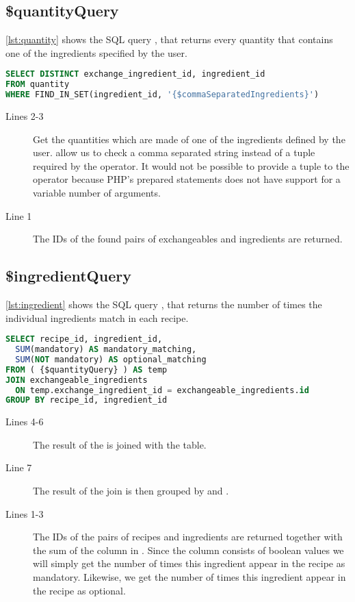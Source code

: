 \subsection*{\$quantityQuery}
\autoref{lst:quantity} shows the SQL query , that returns every quantity that contains one of the ingredients specified by the user.
\begin{lstlisting}[language=SQL, float=h, label={lst:quantity}, caption={\$quantityQuery, return quantities that match the search.}]
SELECT DISTINCT exchange_ingredient_id, ingredient_id
FROM quantity
WHERE FIND_IN_SET(ingredient_id, '{$commaSeparatedIngredients}')
\end{lstlisting}
\begin{description}
\item[Lines 2-3] Get the quantities which are made of one of the ingredients defined by the user.  allow us to check a comma separated string instead of a tuple required by the  operator. It would not be possible to provide a tuple to the  operator because PHP's prepared statements does not have support for a variable number of arguments.
\item[Line 1] The IDs of the found pairs of exchangeables and ingredients are returned.
\end{description}



\subsection*{\$ingredientQuery}
\autoref{lst:ingredient} shows the SQL query , that returns the number of times the individual ingredients match in each recipe.
\begin{lstlisting}[language=SQL, float=h, label={lst:ingredient}, caption={\$ingredientQuery, returns the number of times the individual ingredients appear in each recipe.}]
SELECT recipe_id, ingredient_id,
  SUM(mandatory) AS mandatory_matching,
  SUM(NOT mandatory) AS optional_matching
FROM ( {$quantityQuery} ) AS temp
JOIN exchangeable_ingredients
  ON temp.exchange_ingredient_id = exchangeable_ingredients.id
GROUP BY recipe_id, ingredient_id
\end{lstlisting}
\begin{description}
\item[Lines 4-6] The result of the  is joined with the  table.
\item[Line 7] The result of the join is then grouped by  and .
\item[Lines 1-3] The IDs of the pairs of recipes and ingredients are returned together with the sum of the  column in . Since the  column consists of boolean values we will simply get the number of times this ingredient appear in the recipe as mandatory. Likewise, we get the number of times this ingredient appear in the recipe as optional.
\end{description}



